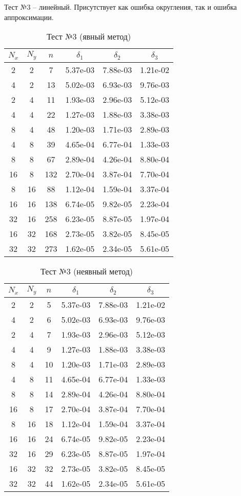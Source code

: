 \newpage
Тест №3 -- линейный. Присутствует как ошибка округления, так и ошибка аппроксимации.
\begin{table}[H]
	\centering
	\begin{tabular}{*6c}
		\toprule
		$N_x$ & $N_y$ & $n$ & $\delta_1$ & $\delta_2$ & $\delta_3$ \\
		\midrule
		2 & 2 & 7 & 5.37e-03 & 7.88e-03 & 1.21e-02 \\
		4 & 2 & 13 & 5.02e-03 & 6.93e-03 & 9.76e-03 \\
		2 & 4 & 11 & 1.93e-03 & 2.96e-03 & 5.12e-03 \\
		4 & 4 & 22 & 1.27e-03 & 1.88e-03 & 3.38e-03 \\
		8 & 4 & 48 & 1.20e-03 & 1.71e-03 & 2.89e-03 \\
		4 & 8 & 39 & 4.65e-04 & 6.77e-04 & 1.33e-03 \\
		8 & 8 & 67 & 2.89e-04 & 4.26e-04 & 8.80e-04 \\
		16 & 8 & 132 & 2.70e-04 & 3.87e-04 & 7.70e-04 \\
		8 & 16 & 88 & 1.12e-04 & 1.59e-04 & 3.37e-04 \\
		16 & 16 & 138 & 6.74e-05 & 9.82e-05 & 2.23e-04 \\
		32 & 16 & 258 & 6.23e-05 & 8.87e-05 & 1.97e-04 \\
		16 & 32 & 168 & 2.73e-05 & 3.82e-05 & 8.45e-05 \\
		32 & 32 & 273 & 1.62e-05 & 2.34e-05 & 5.61e-05 \\
		\bottomrule
	\end{tabular}
	\caption{Тест №3 (явный метод)}
\end{table}
\begin{table}[H]
	\centering
	\begin{tabular}{*6c}
		\toprule
		$N_x$ & $N_y$ & $n$ & $\delta_1$ & $\delta_2$ & $\delta_3$ \\
		\midrule
		2 & 2 & 5 & 5.37e-03 & 7.88e-03 & 1.21e-02 \\
		4 & 2 & 6 & 5.02e-03 & 6.93e-03 & 9.76e-03 \\
		2 & 4 & 7 & 1.93e-03 & 2.96e-03 & 5.12e-03 \\
		4 & 4 & 9 & 1.27e-03 & 1.88e-03 & 3.38e-03 \\
		8 & 4 & 10 & 1.20e-03 & 1.71e-03 & 2.89e-03 \\
		4 & 8 & 11 & 4.65e-04 & 6.77e-04 & 1.33e-03 \\
		8 & 8 & 14 & 2.89e-04 & 4.26e-04 & 8.80e-04 \\
		16 & 8 & 17 & 2.70e-04 & 3.87e-04 & 7.70e-04 \\
		8 & 16 & 18 & 1.12e-04 & 1.59e-04 & 3.37e-04 \\
		16 & 16 & 24 & 6.74e-05 & 9.82e-05 & 2.23e-04 \\
		32 & 16 & 29 & 6.23e-05 & 8.87e-05 & 1.97e-04 \\
		16 & 32 & 32 & 2.73e-05 & 3.82e-05 & 8.45e-05 \\
		32 & 32 & 44 & 1.62e-05 & 2.34e-05 & 5.61e-05 \\
		\bottomrule
	\end{tabular}
	\caption{Тест №3 (неявный метод)}
\end{table}

